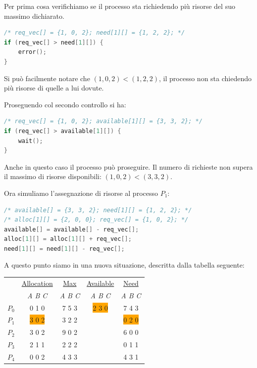 \documentclass[a4paper,12pt, twoside]{report}
\begin{document}
Per prima cosa verifichiamo se il processo sta richiedendo pi\`u risorse del suo massimo dichiarato.

\begin{lstlisting}[language=C]
/* req_vec[] = {1, 0, 2}; need[1][] = {1, 2, 2}; */
if (req_vec[] > need[1][]) {
	error();
}
\end{lstlisting}
Si pu\`o facilmente notare che $(1, 0, 2) < (1, 2, 2)$, il processo non sta chiedendo pi\`u risorse di quelle a lui dovute.

Proseguendo col secondo controllo si ha: 
\begin{lstlisting}[language=C]
/* req_vec[] = {1, 0, 2}; available[1][] = {3, 3, 2}; */
if (req_vec[] > available[1][]) {
	wait();
}
\end{lstlisting}
Anche in questo caso il processo pu\`o proseguire. Il numero di richieste non supera il massimo di risorse disponibili: $(1, 0, 2) < (3, 3, 2)$. 

Ora simuliamo l'assegnazione di risorse al processo $P_1$:
\begin{lstlisting}[language=C]
/* available[] = {3, 3, 2}; need[1][] = {1, 2, 2}; */
/* alloc[1][] = {2, 0, 0}; req_vec[] = {1, 0, 2}; */
available[] = available[] - req_vec[];
alloc[1][] = alloc[1][] + req_vec[];
need[1][] = need[1][] - req_vec[];
\end{lstlisting}
A questo punto siamo in una nuova situazione, descritta dalla tabella seguente:
\begin{center}
\begin{tabular}{c | c  | c | c | c }
 & \underline{Allocation} & \underline{Max} & \underline{Available} & \underline{Need} \\
 & \emph{A B C} & \emph{A B C} & \emph{A B C} & \emph{A B C} \\
 $P_0$ & 0 1 0 & 7 5 3 & \colorbox{orange}{2 3 0} & 7 4 3 \\
 $P_1$ &\colorbox{orange}{3 0 2} & 3 2 2 & & \colorbox{orange}{0 2 0} \\
 $P_2$ & 3 0 2 & 9 0 2 & & 6 0 0 \\
 $P_3$ & 2 1 1 & 2 2 2 & & 0 1 1 \\
 $P_4$ & 0 0 2 & 4 3 3 & & 4 3 1 \\
 \end{tabular}
 \end{center}
\end{document}
